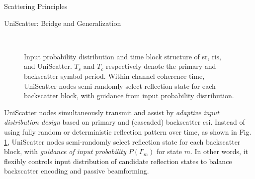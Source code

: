 \documentclass[journal]{IEEEtran}
\begin{document}
\begin{section}{Scattering Principles}
	\begin{subsection}{UniScatter: Bridge and Generalization}
		\begin{figure}[!t]
			\centering
			\\
			\caption{
				Input probability distribution and time block structure of \gls{sr}, \gls{ris}, and UniScatter.
				$T_s$ and $T_c$ respectively denote the primary and backscatter symbol period.
				Within channel coherence time, UniScatter nodes semi-randomly select reflection state for each backscatter block, with guidance from input probability distribution.
			}
			\label{fi:uniscatter}
		\end{figure}
		UniScatter nodes simultaneously transmit and assist by \emph{adaptive input distribution design} based on primary and (cascaded) backscatter \gls{csi}.
		Instead of using fully random or deterministic reflection pattern over time, as shown in Fig. \ref{fi:uniscatter}, UniScatter nodes semi-randomly select reflection state for each backscatter block, with \emph{guidance of input probability $P(\Gamma_m)$} for state $m$. In other words, it flexibly controls input distribution of candidate reflection states to balance backscatter encoding and passive beamforming.

\end{subsection}
\end{section}
\end{document}
